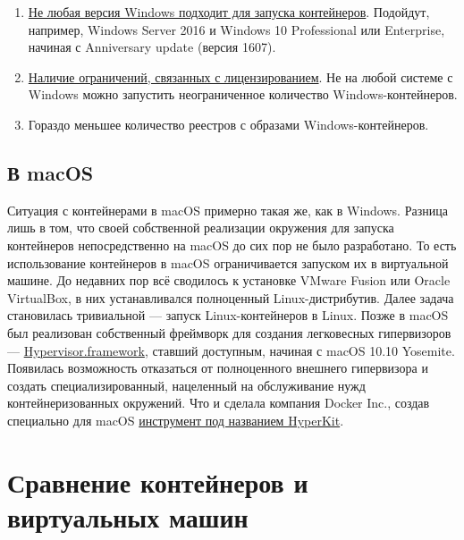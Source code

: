\documentclass[14pt, a4paper]{article}
\begin{document}
\begin{enumerate}
    \item \href{https://docs.microsoft.com/en-us/virtualization/windowscontainers/about/faq#what-are-the-prerequisites-for-running-containers-on-windows}{Не любая версия Windows подходит для запуска контейнеров}. Подойдут, например, Windows
    Server 2016 и Windows 10 Professional или Enterprise, начиная с Anniversary update (версия
    1607).
    \item \href{https://docs.microsoft.com/en-us/virtualization/windowscontainers/about/faq#how-are-containers-licensed-is-there-a-limit-to-the-number-of-containers-i-can-run}{Наличие ограничений, связанных с лицензированием}. Не на любой системе с Windows можно
    запустить неограниченное количество Windows-контейнеров.
    \item Гораздо меньшее количество реестров с образами Windows-контейнеров.\\
\end{enumerate}

\subsection*{В macOS}

Ситуация с контейнерами в macOS примерно такая же, как в Windows. Разница лишь в том, что своей
собственной реализации окружения для запуска контейнеров непосредственно на macOS до сих пор
не было разработано. То есть использование контейнеров в macOS ограничивается запуском их в
виртуальной машине. До недавних пор всё сводилось к установке VMware Fusion или Oracle
VirtualBox, в них устанавливался полноценный Linux-дистрибутив. Далее задача становилась
тривиальной — запуск Linux-контейнеров в Linux. Позже в macOS был реализован собственный
фреймворк для создания легковесных гипервизоров — \href{https://developer.apple.com/documentation/hypervisor}{Hypervisor.framework}, ставший доступным,
начиная с macOS 10.10 Yosemite. Появилась возможность отказаться от полноценного внешнего
гипервизора и создать специализированный, нацеленный на обслуживание нужд контейнеризованных
окружений. Что и сделала компания Docker Inc., создав специально для macOS \href{https://github.com/moby/hyperkit}{инструмент под
названием HyperKit}.\newpage


\section*{Сравнение контейнеров и виртуальных машин}
\end{document}
